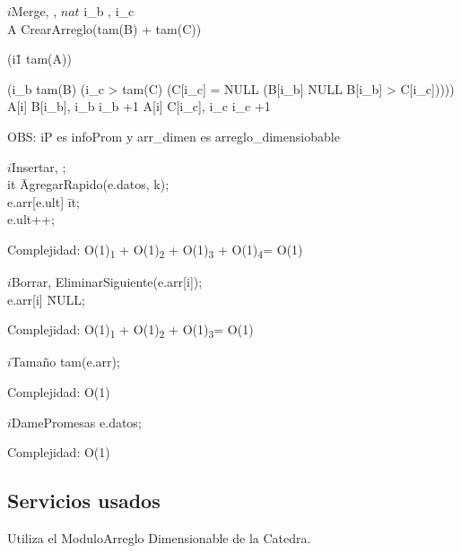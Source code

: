 	\begin{algorithm}{$i$Merge}{, , }{}
		$nat$ i_b , i_c  \\
		A \leftarrow CrearArreglo(tam(B) + tam(C)) \\
		\begin{FOR}{(i\=1 \TO tam(A))}
			\begin{IF}{(i_b \leq tam(B) \wedge (i_c > tam(C) \vee (C[i_c] = NULL \oluego (B[i_b] \neq NULL \yluego B[i_b] > C[i_c]))))}
				A[i] \leftarrow B[i_b], i_b \leftarrow i_b +1
			\ELSE
				A[i] \leftarrow C[i_c], i_c \leftarrow i_c +1
			\end{IF}
		\end{FOR}
	\end{algorithm}
	OBS: iP es infoProm y arr\_dimen es arreglo\_dimensiobable
	\\

	
	\begin{algorithm}{$i$Insertar}{,  }{}
	;\\
	it \= AgregarRapido(e.datos, k);\\
	e.arr[e.ult] \= it;\\
	e.ult++;
	\end{algorithm}
	Complejidad:  O(1)\textsubscript{1} + O(1)\textsubscript{2} + O(1)\textsubscript{3} + O(1)\textsubscript{4}= O(1)
	 \\	

	\begin{algorithm}{$i$Borrar}{,  }{}
	EliminarSiguiente(e.arr[i]);\\
	e.arr[i] \= NULL;
	\end{algorithm}
	Complejidad:  O(1)\textsubscript{1} + O(1)\textsubscript{2} + O(1)\textsubscript{3}= O(1)
	 \\
	
	\begin{algorithm}{$i$Tama\~no}{}{}
	\RETURN tam(e.arr);
	\end{algorithm}
	Complejidad:  O(1)

	\begin{algorithm}{$i$DamePromesas}{}{}
	\RETURN e.datos;
	\end{algorithm}
	Complejidad:  O(1)

	
	\subsection{Servicios usados}

Utiliza el Modulo{\LARGE  Arreglo Dimensionable }de la Catedra.\\

